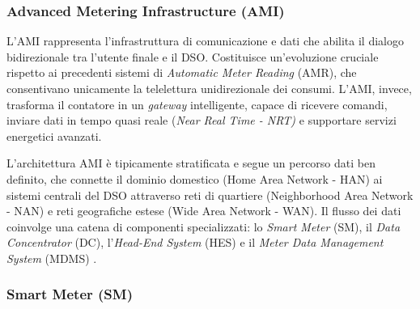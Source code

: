 \subsubsection{Advanced Metering Infrastructure (AMI)}



L'AMI rappresenta l'infrastruttura di comunicazione e dati che abilita il dialogo bidirezionale tra l'utente finale e il DSO. Costituisce un'evoluzione cruciale rispetto ai precedenti sistemi di \textit{Automatic Meter Reading} (AMR), che consentivano unicamente la telelettura unidirezionale dei consumi. L'AMI, invece, trasforma il contatore in un \textit{gateway} intelligente, capace di ricevere comandi, inviare dati in tempo quasi reale (\textit{Near Real Time - NRT)} e supportare servizi energetici avanzati.






L'architettura AMI è tipicamente stratificata e segue un percorso dati ben definito, che connette il dominio domestico (Home Area Network - HAN) ai sistemi centrali del DSO attraverso reti di quartiere (Neighborhood Area Network - NAN) e reti geografiche estese (Wide Area Network - WAN). Il flusso dei dati coinvolge una catena di componenti specializzati: lo \textit{Smart Meter} (SM), il \textit{Data Concentrator} (DC), l'\textit{Head-End System} (HES) e il \textit{Meter Data Management System} (MDMS) \cite{AMI}.


\subsubsection{Smart Meter (SM)}



